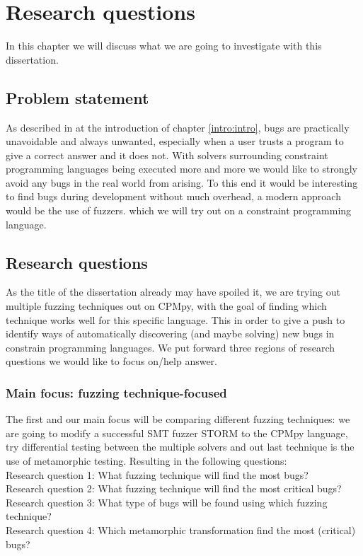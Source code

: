 \chapter{Research questions}
\label{cha:RQ}
\label{RQ:intro}
In this chapter we will discuss what we are going to investigate with this dissertation.

\section{Problem statement}\label{RQ:ProblemStatment}
As described in at the introduction of chapter \ref{intro:intro}, bugs are practically unavoidable and always unwanted, especially when a user trusts a program to give a correct answer and it does not. With solvers surrounding constraint programming languages being executed more and more we would like to strongly avoid any bugs in the real world from arising. To this end it would be interesting to find bugs during development without much overhead, a modern approach would be the use of fuzzers. which we will try out on a constraint programming language.

\section{Research questions}\label{RQ:RQ's}
As the title of the dissertation already may have spoiled it, we are trying out multiple fuzzing techniques out on CPMpy, with the goal of finding which technique works well for this specific language. This in order to give a push to identify ways of automatically discovering (and maybe solving) new bugs in constrain programming languages. We put forward three regions of research questions we would like to focus on/help answer.

\subsection{Main focus: fuzzing technique-focused}
The first and our main focus will be comparing different fuzzing techniques: we are going to modify a successful SMT fuzzer STORM to the CPMpy language, try differential testing between the multiple solvers and out last technique is the use of metamorphic testing. Resulting in the following questions: 
\\
Research question 1: What fuzzing technique will find the most bugs?\\ 
Research question 2: What fuzzing technique will find the most critical bugs?\\
Research question 3: What type of bugs will be found using which fuzzing technique?\\
Research question 4: Which metamorphic transformation find the most (critical) bugs?\\
